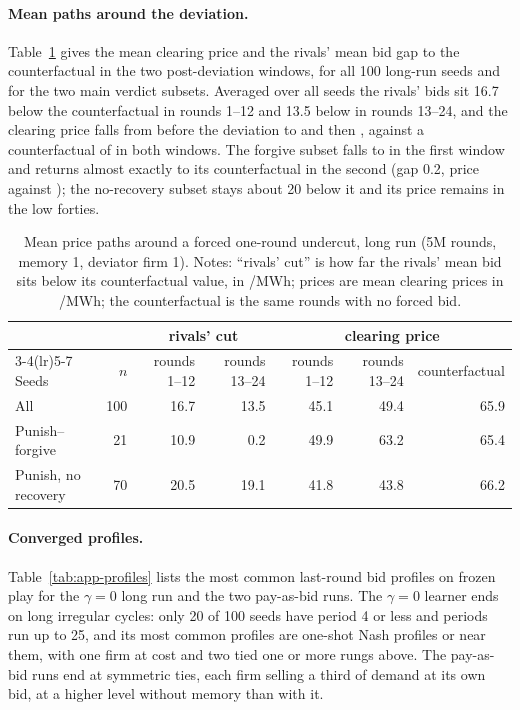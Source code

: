 \paragraph{Mean paths around the deviation.} Table~\ref{tab:app-path} gives the mean clearing price and the rivals' mean bid gap to the counterfactual in the two post-deviation windows, for all 100 long-run seeds and for the two main verdict subsets. Averaged over all seeds the rivals' bids sit 16.7 below the counterfactual in rounds 1--12 and 13.5 below in rounds 13--24, and the clearing price falls from  before the deviation to  and then , against a counterfactual of  in both windows. The forgive subset falls to  in the first window and returns almost exactly to its counterfactual in the second (gap 0.2, price  against ); the no-recovery subset stays about 20 below it and its price remains in the low forties.

\begin{table}[htbp]
\centering
\caption{Mean price paths around a forced one-round undercut, long run (5M rounds, memory 1, deviator firm 1). Notes: ``rivals' cut'' is how far the rivals' mean bid sits below its counterfactual value, in \texteuro/MWh; prices are mean clearing prices in \texteuro/MWh; the counterfactual is the same rounds with no forced bid.}
\label{tab:app-path}
\footnotesize
\setlength{\tabcolsep}{4pt}
\begin{tabular}{lrrrrrr}
\toprule
 & & \multicolumn{2}{c}{rivals' cut} & \multicolumn{3}{c}{clearing price} \\
\cmidrule(lr){3-4}\cmidrule(lr){5-7}
Seeds & $n$ & rounds 1--12 & rounds 13--24 & rounds 1--12 & rounds 13--24 & counterfactual \\
\midrule
All & 100 & 16.7 & 13.5 & 45.1 & 49.4 & 65.9 \\
Punish--forgive & 21 & 10.9 & 0.2 & 49.9 & 63.2 & 65.4 \\
Punish, no recovery & 70 & 20.5 & 19.1 & 41.8 & 43.8 & 66.2 \\
\bottomrule
\end{tabular}
\end{table}

\paragraph{Converged profiles.} Table~\ref{tab:app-profiles} lists the most common last-round bid profiles on frozen play for the $\gamma = 0$ long run and the two pay-as-bid runs. The $\gamma = 0$ learner ends on long irregular cycles: only 20 of 100 seeds have period 4 or less and periods run up to 25, and its most common profiles are one-shot Nash profiles or near them, with one firm at cost and two tied one or more rungs above. The pay-as-bid runs end at symmetric ties, each firm selling a third of demand at its own bid, at a higher level without memory than with it.

